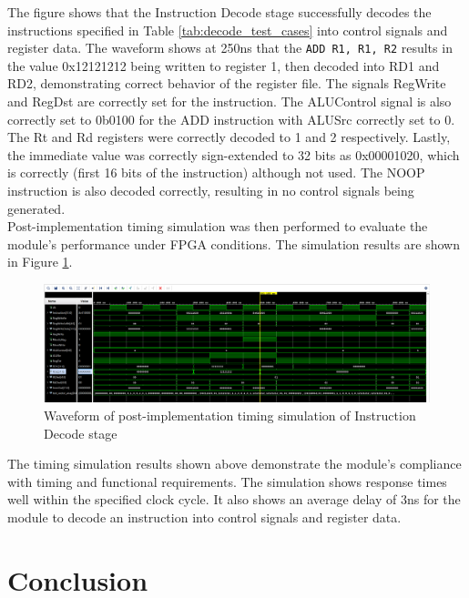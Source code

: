 \documentclass[CMPE]{../KGCOEReport}
\begin{document}
The figure shows that the Instruction Decode stage successfully decodes the instructions specified in Table \ref{tab:decode_test_cases} into control signals and register data. The waveform shows at 250ns that the \verb|ADD R1, R1, R2| results in the value 0x12121212 being written to register 1, then decoded into RD1 and RD2, demonstrating correct behavior of the register file. The signals RegWrite and RegDst are correctly set for the instruction. The ALUControl signal is also correctly set to 0b0100 for the ADD instruction with ALUSrc correctly set to 0. The Rt and Rd registers were correctly decoded to 1 and 2 respectively. Lastly, the immediate value was correctly sign-extended to 32 bits as 0x00001020, which is correctly (first 16 bits of the instruction) although not used. The NOOP instruction is also decoded correctly, resulting in no control signals being generated.
\\

Post-implementation timing simulation was then performed to evaluate the module's performance under FPGA conditions. The simulation results are shown in Figure \ref{fig:implement_decode}.

\begin{figure}[H]
    \centering
    \includegraphics[width=1\textwidth]{implement_decode.png}
    \caption{Waveform of post-implementation timing simulation of Instruction Decode stage}
    \label{fig:implement_decode}
\end{figure}

The timing simulation results shown above demonstrate the module's compliance with timing and functional requirements. The simulation shows response times well within the specified clock cycle. It also shows an average delay of 3ns for the module to decode an instruction into control signals and register data.

\section*{Conclusion}
\end{document}
